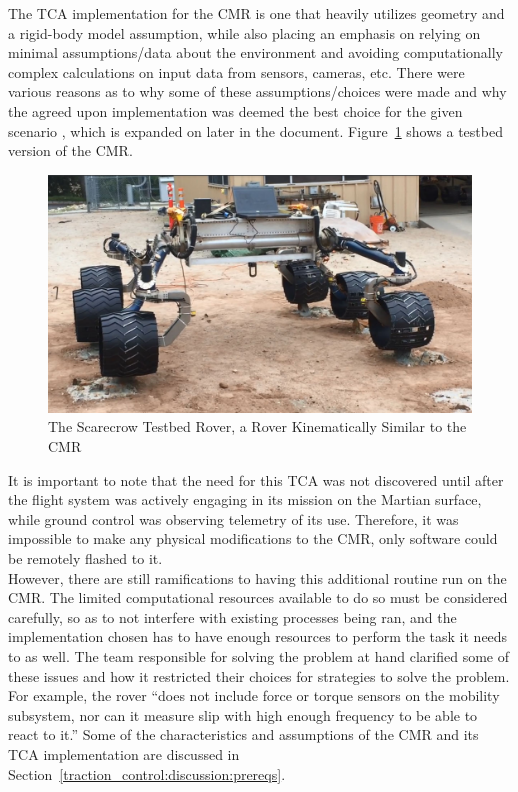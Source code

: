 The \ac{TCA} implementation for the \ac{CMR} is one that heavily utilizes geometry and a rigid-body model assumption, while also placing an emphasis on relying on minimal assumptions/data about the environment and avoiding computationally complex calculations on input data from sensors, cameras, etc. There were various reasons as to why some of these assumptions/choices were made and why the agreed upon implementation was deemed the best choice for the given scenario \cite{tractl}, which is expanded on later in the document. Figure~\ref{traction_control:introduction:scarecrow} shows a testbed version of the \ac{CMR}.

\begin{figure}[htbp]
	\centering
	\includegraphics[width=.9\textwidth]{sections/introduction/images/scarecrow_testbed.png}
	\caption{The Scarecrow Testbed Rover, a Rover Kinematically Similar to the \acl{CMR} \cite{tractl}}
	\label{traction_control:introduction:scarecrow}
\end{figure}

It is important to note that the need for this \ac{TCA} was not discovered until after the flight system was actively engaging in its mission on the Martian surface, while ground control was observing telemetry of its use. Therefore, it was impossible to make any physical modifications to the \ac{CMR}, only software could be remotely flashed to it. \\

However, there are still ramifications to having this additional routine run on the \ac{CMR}. The limited computational resources available to do so must be considered carefully, so as to not interfere with existing processes being ran, and the implementation chosen has to have enough resources to perform the task it needs to as well. The team responsible for solving the problem at hand clarified some of these issues and how it restricted their choices for strategies to solve the problem. For example, the rover ``does not include force or torque sensors on the mobility subsystem, nor can it measure slip with high enough frequency to be able to react to it.'' \cite{tractl} Some of the characteristics and assumptions of the \ac{CMR} and its \ac{TCA} implementation are discussed in Section~\ref{traction_control:discussion:prereqs}. \\

